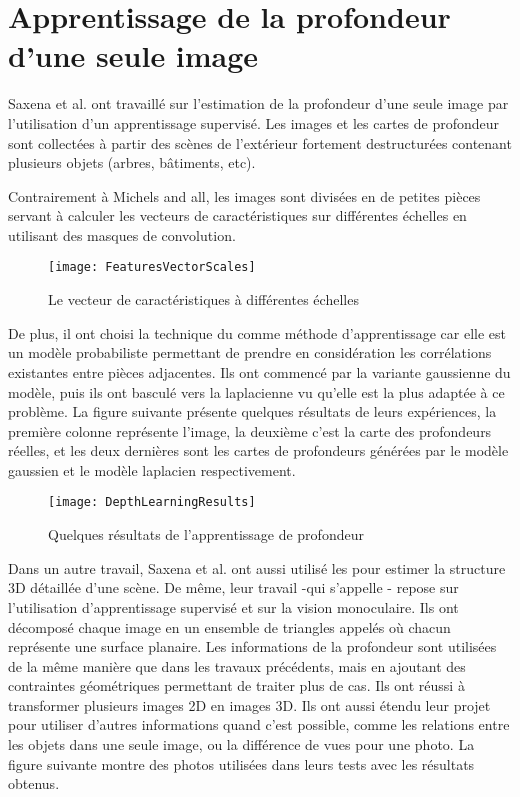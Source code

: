 \section{Apprentissage de la profondeur d'une seule image}

Saxena et al.\cite{saxena2005learning} ont travaillé sur l'estimation de la
profondeur d'une seule image par l'utilisation d'un apprentissage supervisé.
Les images et les cartes de profondeur sont collectées à partir des scènes de
l'extérieur fortement destructurées contenant plusieurs objets (arbres, bâtiments, etc).

Contrairement à Michels and all, les images sont divisées en de petites
pièces servant à calculer les vecteurs de caractéristiques sur différentes
échelles en utilisant des masques de convolution.

\begin{figure}[H]
\begin{center}
\texttt{[image: FeaturesVectorScales]}
\caption{Le vecteur de caractéristiques à  différentes échelles}
\end{center}
\end{figure}

De plus, il ont choisi la technique du  comme
méthode d'apprentissage car elle est un modèle probabiliste permettant de
prendre en considération les corrélations existantes entre pièces adjacentes.
Ils ont commencé par la variante gaussienne du modèle, puis ils ont
basculé vers la laplacienne vu qu'elle est la plus adaptée à ce problème.
La figure suivante présente quelques résultats de leurs expériences, la première
colonne représente l'image, la deuxième c'est la carte des profondeurs réelles, et
les deux dernières sont les cartes de profondeurs générées par le modèle gaussien
et le modèle laplacien respectivement.

\begin{figure}[H]
\begin{center}
\texttt{[image: DepthLearningResults]}
\caption{Quelques résultats de l'apprentissage de profondeur}
\end{center}
\end{figure}

Dans un autre travail, Saxena et al.\cite{saxena2009make3d} ont aussi utilisé les
pour estimer la structure 3D détaillée d'une scène. De même, leur travail -qui
s'appelle - repose sur l'utilisation d'apprentissage supervisé et
sur la vision monoculaire. Ils ont décomposé chaque image en un ensemble de
triangles appelés  où chacun représente une surface planaire.
Les informations de la profondeur sont utilisées de la même manière que dans les
travaux précédents, mais en ajoutant des contraintes géométriques permettant de
traiter plus de cas. Ils ont réussi à transformer plusieurs images 2D en
images 3D. Ils ont aussi étendu leur projet pour utiliser d'autres informations
quand c'est possible, comme les relations entre les objets dans une seule image, ou
la différence de vues pour une photo. La figure suivante montre des photos
utilisées dans leurs tests avec les résultats obtenus.

